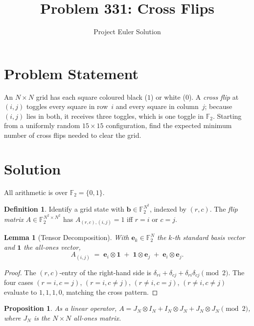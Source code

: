 \documentclass[12pt]{article}
\title{Problem 331: Cross Flips}
\author{Project Euler Solution}
\date{}
\newtheorem{lemma}[theorem]{Lemma}
\newtheorem{proposition}[theorem]{Proposition}
\theoremstyle{definition}
\newtheorem{definition}[theorem]{Definition}
\begin{document}
\maketitle

\section{Problem Statement}

An $N\times N$ grid has each square coloured black ($1$) or white ($0$).
A \emph{cross flip} at $(i,j)$ toggles every square in row~$i$ and every
square in column~$j$; because $(i,j)$ lies in both, it receives three
toggles, which is one toggle in $\mathbb{F}_2$.  Starting from a uniformly
random $15\times 15$ configuration, find the expected minimum number of
cross flips needed to clear the grid.

\section{Solution}

All arithmetic is over $\mathbb{F}_2=\{0,1\}$.

\begin{definition}
Identify a grid state with $\mathbf{b}\in\mathbb{F}_2^{N^2}$, indexed by
$(r,c)$.  The \emph{flip matrix} $A\in\mathbb{F}_2^{N^2\times N^2}$ has
$A_{(r,c),(i,j)}=1$ iff $r=i$ or $c=j$.
\end{definition}

\begin{lemma}[Tensor Decomposition]\label{lem:tensor}
With $\mathbf{e}_k\in\mathbb{F}_2^N$ the $k$-th standard basis vector and
$\mathbf{1}$ the all-ones vector,
\[
  A_{(i,j)} \;=\; \mathbf{e}_i\otimes\mathbf{1}
  \;+\; \mathbf{1}\otimes\mathbf{e}_j
  \;+\; \mathbf{e}_i\otimes\mathbf{e}_j.
\]
\end{lemma}

\begin{proof}
The $(r,c)$-entry of the right-hand side is
$\delta_{ri}+\delta_{cj}+\delta_{ri}\delta_{cj}\pmod{2}$.
The four cases $(r=i,c=j)$, $(r=i,c\neq j)$, $(r\neq i,c=j)$,
$(r\neq i,c\neq j)$ evaluate to $1,1,1,0$, matching the cross pattern.
\end{proof}

\begin{proposition}\label{prop:opdecomp}
As a linear operator,
$A = J_N\otimes I_N + I_N\otimes J_N + J_N\otimes J_N \pmod{2}$,
where $J_N$ is the $N\times N$ all-ones matrix.
\end{proposition}
\end{document}
